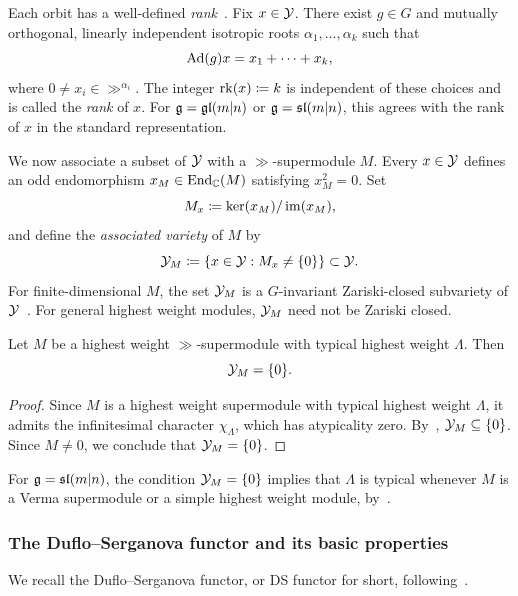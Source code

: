 Each orbit has a well-defined \emph{rank}~\cite[Section~4]{duflo2005associated}. Fix $x\in\YY$. There exist $g\in G$ and mutually orthogonal, linearly independent isotropic roots $\alpha_{1},\dotsc,\alpha_{k}$ such that
\begin{equation}
\Ad(g)x=x_{1}+\dotsb+x_{k},
\end{equation}
where $0\neq x_{i}\in\gg^{\alpha_{i}}$. The integer
$
\rk(x)\coloneqq k
$
is independent of these choices and is called the \emph{rank} of $x$. For $\gg=\glmn$ or $\gg=\slmn$, this agrees with the rank of $x$ in the standard representation.

We now associate a subset of $\YY$ with a $\gg$-supermodule $M$. Every $x\in\YY$ defines an odd endomorphism $x_{M}\in\End_{\CC}(M)$ satisfying
$
x_{M}^{2}=0.
$
Set
\begin{equation}
M_{x}\coloneqq \Ker(x_{M})/\Im(x_{M}),
\end{equation}
and define the \emph{associated variety} of $M$ by
\begin{equation}
\YY_{M}\coloneqq \{x\in\YY:M_{x}\neq\{0\}\}\subset\YY.
\end{equation}
For finite-dimensional $M$, the set $\YY_{M}$ is a $G$-invariant Zariski-closed subvariety of $\YY$~\cite{duflo2005associated}. For general highest weight modules, $\YY_{M}$ need not be Zariski closed.

\begin{proposition}
\label{VarietyTypical}
Let $M$ be a highest weight $\gg$-supermodule with typical highest weight $\Lambda$. Then 
\[
\YY_{M}=\{0\}.
\]
\end{proposition}
\begin{proof}
    Since $M$ is a highest weight supermodule with typical highest weight $\Lambda$, it admits the infinitesimal character $\chi_\Lambda$, which has atypicality zero. By~\cite[Theorem~5.3]{duflo2005associated}, $\YY_M\subseteq\{0\}$. Since $M\neq0$, we conclude that $\YY_M=\{0\}$.
\end{proof}

\begin{remark}
For $\gg=\sl(m\vert n)$, the condition $\YY_M=\{0\}$ implies that $\Lambda$ is typical whenever $M$ is a Verma supermodule or a simple highest weight module, by~\cite[Proposition~5.14]{coulembier2017homological}.
\end{remark}

\subsubsection{The Duflo--Serganova functor and its basic properties}
We recall the Duflo--Serganova functor, or DS functor for short, following~\cite{duflo2005associated,serganova2011superdimension}.

